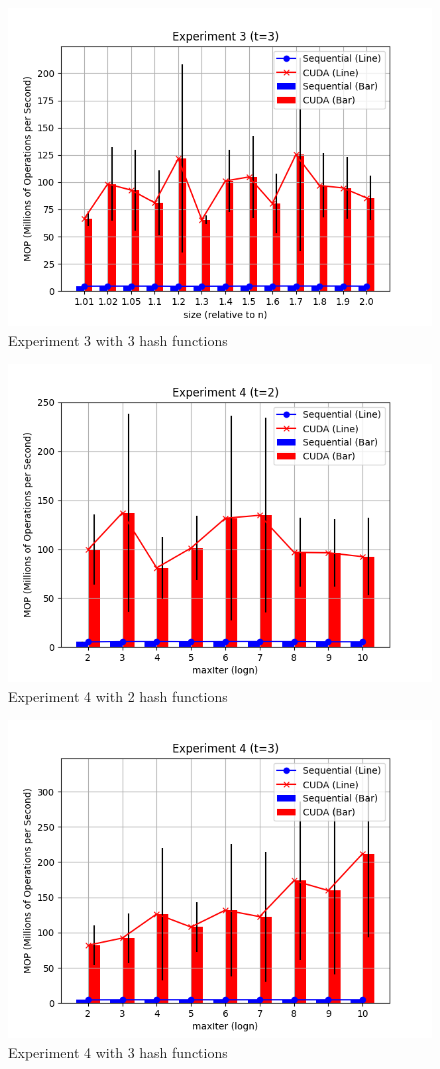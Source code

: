 \documentclass{article}
\begin{document}
\begin{figure}[h!]
    \centering
    \includegraphics[width=\textwidth]{../figs/experiment3_t3.png}
    \caption{Experiment 3 with 3 hash functions}
\end{figure}

\begin{figure}[h!]
    \centering
    \includegraphics[width=\textwidth]{../figs/experiment4_t2.png}
    \caption{Experiment 4 with 2 hash functions}
\end{figure}

\begin{figure}[h!]
    \centering
    \includegraphics[width=\textwidth]{../figs/experiment4_t3.png}
    \caption{Experiment 4 with 3 hash functions}
\end{figure}
\end{document}
